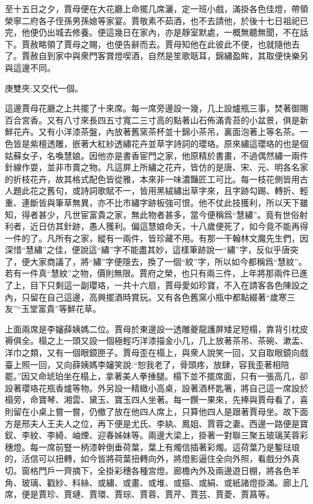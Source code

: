 \begin{parag}
    至十五日之夕，賈母便在大花廳上命擺几席灑，定一班小戲，滿掛各色佳燈，帶領榮寧二府各子侄孫男孫媳等家宴。賈敬素不茹酒，也不去請他，於後十七日祖祀已完，他便仍出城去修養。便這幾日在家內，亦是靜室默處，一概無聽無聞，不在話下。賈赦略領了賈母之賜，也便告辭而去。賈母知他在此彼此不便，也就隨他去了。賈赦自到家中與衆門客賞燈喫酒，自然是笙歌聒耳，錦繡盈眸，其取便快樂另與這邊不同。\begin{note}庚雙夾:又交代一個。\end{note}
\end{parag}


\begin{parag}
    這邊賈母花廳之上共擺了十來席。每一席旁邊設一幾，几上設爐瓶三事，焚著御賜百合宮香。又有八寸來長四五寸寬二三寸高的點著山石佈滿青苔的小盆景，俱是新鮮花卉。又有小洋漆茶盤，內放著舊窯茶杯並十錦小茶吊，裏面泡著上等名茶。一色皆是紫檀透雕，嵌著大紅紗透繡花卉並草字詩詞的瓔珞。原來繡這瓔珞的也是個姑蘇女子，名喚慧娘。因他亦是書香宦門之家，他原精於書畫，不過偶然繡一兩件針線作耍，並非市賣之物。凡這屏上所繡之花卉，皆仿的是唐、宋、元、明各名家的折枝花卉，故其格式配色皆從雅，本來非一味濃豔匠工可比。每一枝花側皆用古人題此花之舊句，或詩詞歌賦不一，皆用黑絨繡出草字來，且字跡勾踢、轉折、輕重、連斷皆與筆草無異，亦不比市繡字跡板強可恨。他不仗此技獲利，所以天下雖知，得者甚少，凡世宦富貴之家，無此物者甚多，當今便稱爲“慧繡”。竟有世俗射利者，近日仿其針跡，愚人獲利。偏這慧娘命夭，十八歲便死了，如今竟不能再得一件的了。凡所有之家，縱有一兩件，皆珍藏不用。有那一干翰林文魔先生們，因深惜“慧繡”之佳，便說這“繡”字不能盡其妙，這樣筆跡說一“繡”字，反似乎唐突了，便大家商議了，將“繡”字便隱去，換了一個“紋”字，所以如今都稱爲“慧紋”。若有一件真“慧紋”之物，價則無限。賈府之榮，也只有兩三件，上年將那兩件已進了上，目下只剩這一副瓔珞，一共十六扇，賈母愛如珍寶，不入在請客各色陳設之內，只留在自己這邊，高興擺酒時賞玩。又有各色舊窯小瓶中都點綴著“歲寒三友”“玉堂富貴”等鮮花草。
\end{parag}


\begin{parag}
    上面兩席是李嬸薛姨媽二位。賈母於東邊設一透雕夔龍護屏矮足短榻，靠背引枕皮褥俱全。榻之上一頭又設一個極輕巧洋漆描金小几，几上放著茶吊、茶碗、漱盂、洋巾之類，又有一個眼鏡匣子。賈母歪在榻上，與衆人說笑一回，又自取眼鏡向戲臺上照一回，又向薛姨媽李嬸笑說:“恕我老了，骨頭疼，放肆，容我歪著相陪罷。”因又命琥珀坐在榻上，拿著美人拳捶腿。榻下並不擺席面，只有一張高几，卻設著瓔珞花瓶香爐等物。外另設一精緻小高桌，設著酒杯匙箸，將自己這一席設於榻旁，命寶琴、湘雲、黛玉、寶玉四人坐著。每一饌一果來，先捧與賈母看了，喜則留在小桌上嘗一嘗，仍撤了放在他四人席上，只算他四人是跟著賈母坐。故下面方是邢夫人王夫人之位，再下便是尤氏、李紈、鳳姐、賈蓉之妻。西邊一路便是寶釵、李紋、李綺、岫煙、迎春姊妹等。兩邊大梁上，掛著一對聯三聚五玻璃芙蓉彩穗燈。每一席前豎一柄漆幹倒垂荷葉，葉上有燭信插著彩燭。這荷葉乃是鏨琺琅的，活信可以扭轉，如今皆將荷葉扭轉向外，將燈影逼住全向外照，看戲分外真切。窗格門戶一齊摘下，全掛彩穗各種宮燈。廊檐內外及兩邊遊日棚，將各色羊角、玻璃、戳紗、料絲、或繡、或畫、或堆、或摳、或絹、或紙諸燈掛滿。廊上几席，便是賈珍、賈璉、賈環、賈琮、賈蓉、賈芹、賈芸、賈菱、賈菖等。
\end{parag}


